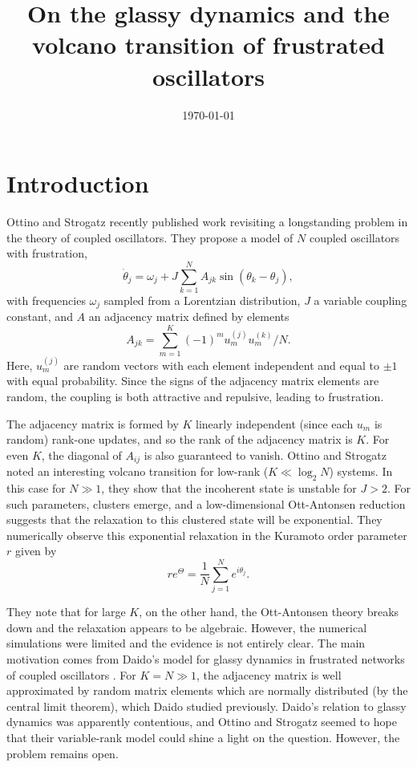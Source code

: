 \documentclass[aps,pre,amsmath,amssymb,floatfix,onecolumn,notitlepage,10pt]{revtex4-1}
\begin{document}
\title{On the glassy dynamics and the volcano transition of frustrated oscillators}
\date{\today}

\maketitle

\section{Introduction}
Ottino and Strogatz recently published work \cite{strogatz} revisiting a longstanding problem in the theory of coupled oscillators. 
They propose a model of $N$ coupled oscillators with frustration,
\begin{equation}
\label{ode}
\dot{\theta}_j = \omega_j +J\sum_{k=1}^N A_{jk}\sin\left(\theta_k-\theta_j\right),
\end{equation}
with frequencies $\omega_j$ sampled from a Lorentzian distribution, $J$ a variable coupling constant, and $A$ an adjacency matrix defined by elements
\begin{equation}
\label{adjacency}
A_{jk} = \sum_{m=1}^{K}(-1)^m u_m^{(j)}u_m^{(k)}/N.
\end{equation}
Here, $u_m^{(j)}$ are random vectors with each element independent and equal to $\pm 1$ with equal probability. Since the signs of the adjacency matrix elements are random, the coupling is both attractive and repulsive,  leading to frustration. 

The adjacency matrix is formed by $K$ linearly independent (since each $u_m$ is random) rank-one updates, and so the rank of the adjacency matrix is $K$. For even $K$, the diagonal of $A_{ij}$ is also guaranteed to vanish. Ottino and Strogatz noted an interesting volcano transition for low-rank ($K\ll \log_2 N$) systems. In this case for $N\gg 1$,  they show that the incoherent state is unstable for $J>2$. For such parameters, clusters emerge,  and a low-dimensional Ott-Antonsen reduction suggests that the relaxation to this clustered state will be exponential. They numerically observe this exponential relaxation in the Kuramoto order parameter $r$ given by
\begin{equation}
\label{kuramoto}
re^{\Theta} = \frac{1}{N}\sum_{j=1}^N e^{i\theta_j}.
\end{equation}

They note that for large $K$, on the other hand, the Ott-Antonsen theory breaks down and the relaxation appears to be algebraic. However, the numerical simulations were limited and the evidence is not entirely clear. The main motivation comes from Daido's model for glassy dynamics in frustrated networks of coupled oscillators \cite{daido}. For $K=N\gg 1$, the adjacency matrix is well approximated by random matrix elements which are normally distributed (by the central limit theorem), which Daido studied previously.   Daido's relation to glassy dynamics was apparently contentious, and Ottino and Strogatz seemed to hope that their variable-rank model could shine a light on the question. However, the problem remains open.
\end{document}
